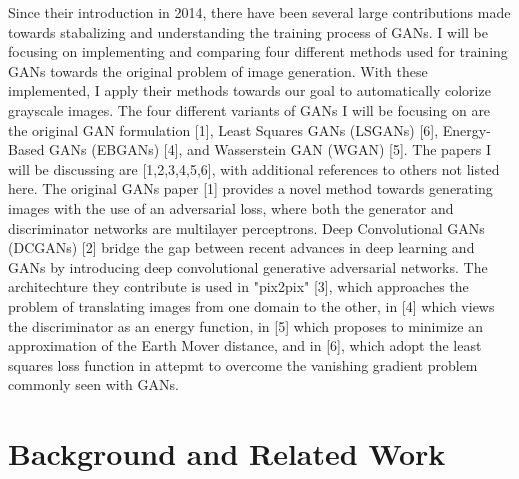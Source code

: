 \documentclass{article}
\begin{document}
\noindent Since their introduction in 2014, there have been several large contributions made towards stabalizing and understanding
the training process of GANs. I will be focusing on implementing and comparing four different methods used for training GANs towards
the original problem of image generation. With these implemented, I apply their methods towards our goal to automatically
colorize grayscale images. The four different variants of GANs I will be focusing on are the original GAN formulation [1], Least Squares
GANs (LSGANs) [6], Energy-Based GANs (EBGANs) [4], and Wasserstein GAN (WGAN) [5]. The papers I will be discussing are [1,2,3,4,5,6], with additional
references to others not listed here. The original GANs paper [1] provides a novel method towards generating images with the use of an
adversarial loss, where both the generator and discriminator networks are multilayer perceptrons. Deep Convolutional GANs (DCGANs) [2]
bridge the gap between recent advances in deep learning and GANs by introducing deep convolutional generative adversarial networks. The architechture they contribute
is used in "pix2pix" [3], which approaches the problem of translating images from one domain to the other, in [4] which views the discriminator
as an energy function, in [5] which proposes to minimize an approximation of the Earth Mover distance, and in [6], which adopt the
least squares loss function in attepmt to overcome the vanishing gradient problem commonly seen with GANs.

\section{Background and Related Work}

\end{document}
